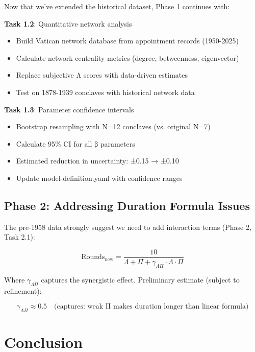 \documentclass[11pt,a4paper]{article}
\begin{document}
Now that we've extended the historical dataset, Phase 1 continues with:

\textbf{Task 1.2}: Quantitative network analysis
\begin{itemize}
    \item Build Vatican network database from appointment records (1950-2025)
    \item Calculate network centrality metrics (degree, betweenness, eigenvector)
    \item Replace subjective Λ scores with data-driven estimates
    \item Test on 1878-1939 conclaves with historical network data
\end{itemize}

\textbf{Task 1.3}: Parameter confidence intervals
\begin{itemize}
    \item Bootstrap resampling with N=12 conclaves (vs. original N=7)
    \item Calculate 95\% CI for all β parameters
    \item Estimated reduction in uncertainty: ±0.15 → ±0.10
    \item Update model-definition.yaml with confidence ranges
\end{itemize}

\subsection{Phase 2: Addressing Duration Formula Issues}

The pre-1958 data strongly suggest we need to add interaction terms (Phase 2, Task 2.1):

\begin{equation}
\text{Rounds}_{\text{new}} = \frac{10}{\Lambda + \Pi + \gamma_{\Lambda\Pi} \cdot \Lambda \cdot \Pi}
\end{equation}

Where $\gamma_{\Lambda\Pi}$ captures the synergistic effect. Preliminary estimate (subject to refinement):

\begin{equation}
\gamma_{\Lambda\Pi} \approx 0.5 \quad \text{(captures: weak Π makes duration longer than linear formula)}
\end{equation}


\section{Conclusion}
\end{document}
